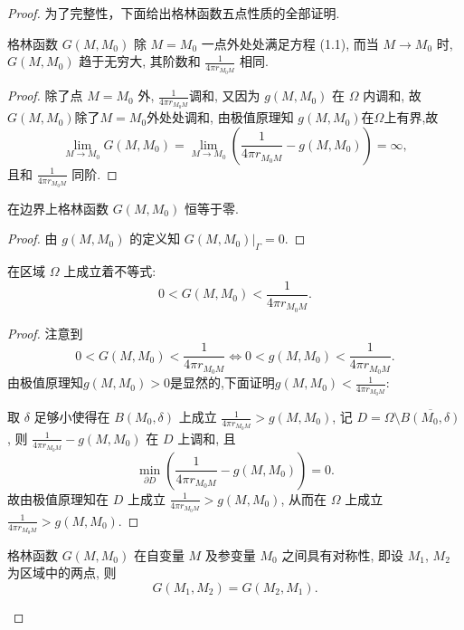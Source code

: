 \begin{proof}
  为了完整性，下面给出格林函数五点性质的全部证明.

  \begin{property}
    格林函数 $G(M, M_0)$ 除 $M=M_0$ 一点外处处满足方程 (1.1), 而当 $M\to M_0$ 时,
    $G(M, M_0)$ 趋于无穷大, 其阶数和 $\displaystyle \frac{1}{4\pi r_{M_0M}}$ 相同.
  \end{property}

  \begin{proof}
    除了点 $M=M_0$ 外, $\displaystyle\frac{1}{4\pi r_{M_0M}}$调和,
    又因为 $g(M,M_0)$ 在 $\varOmega$ 内调和, 故$G(M,M_0)$除了$M=M_0$外处处调和,
    由极值原理知 $g(M,M_0)$在$\varOmega$上有界,故
    \[\lim_{M\to M_0}G(M,M_0)=\lim_{M\to M_0}\left(\frac{1}{4\pi r_{M_0M}}-g(M,M_0)\right)=\infty,\]
    且和 $\displaystyle\frac{1}{4\pi r_{M_0M}}$ 同阶.
  \end{proof}

  \begin{property}
    在边界上格林函数 $G(M, M_0)$ 恒等于零.
  \end{property}

  \begin{proof}
    由 $g(M,M_0)$ 的定义知 $G(M,M_0)|_{\varGamma}=0$.
  \end{proof}

  \begin{property}
    在区域 $\varOmega$ 上成立着不等式:
    \[0 < G(M, M_0) < \frac{1}{4\pi r_{M_0M}}.\]
  \end{property}
  
  \begin{proof}
    注意到
    \[0<G(M,M_0)<\frac{1}{4\pi r_{M_0M}}\Leftrightarrow 0<g(M,M_0)<\frac{1}{4\pi r_{M_0M}}.\]
    由极值原理知$g(M,M_0)>0$是显然的,下面证明$\displaystyle g(M,M_0)<\frac{1}{4\pi r_{M_0M}}$:

    取 $\delta$ 足够小使得在 $B(M_0,\delta)$ 上成立 $\displaystyle\frac{1}{4\pi r_{M_0M}}>g(M,M_0)$,
    记 $D=\varOmega\setminus\overline{B(M_0,\delta)}$,
    则 $\displaystyle\frac{1}{4\pi r_{M_0M}}-g(M,M_0)$ 在 $D$ 上调和, 且
    \[\min_{\partial D}\left(\frac{1}{4\pi r_{M_0M}}-g(M,M_0)\right)=0.\]
    故由极值原理知在 $D$ 上成立 $\displaystyle\frac{1}{4\pi r_{M_0M}}>g(M,M_0)$,
    从而在 $\varOmega$ 上成立 $\displaystyle\frac{1}{4\pi r_{M_0M}}>g(M,M_0)$.
  \end{proof}

  \begin{property}
    格林函数 $G(M, M_0)$ 在自变量 $M$ 及参变量 $M_0$ 之间具有对称性, 即设
    $M_1$, $M_2$ 为区域中的两点, 则
    \[G(M_1, M_2) = G(M_2, M_1).\]
  \end{property}
  

\end{proof}
